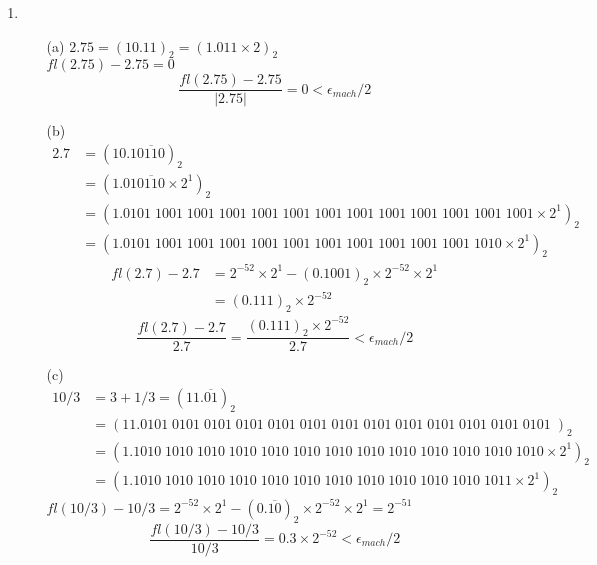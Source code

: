 \documentclass[UTF8]{ctexart}
\begin{document}
\begin{enumerate}
\item \begin{itemize}
\item[(a)] $2.75 = (10.11)_2 = (1.011 \times 2)_2$ \\
$fl(2.75) - 2.75 = 0$ \\
\[
	\frac{fl(2.75) - 2.75}{|2.75|} = 0  < \epsilon_{mach}/2
\]
\item[(b)] \begin{align*}
2.7 &= (10.1\overline{0110})_2 \\
&= (1.01\overline{0110} \times 2^1)_2 \\
&= (1.0101\;1001\;1001\;1001\;1001\;1001\;1001\;1001\;1001\;1001\;1001\;1001\;1001 \times 2^1)_2 \\
&= (1.0101\;1001\;1001\;1001\;1001\;1001\;1001\;1001\;1001\;1001\;1001\;1010 \times 2^1)_2
\end{align*}
\begin{align*}
fl(2.7) - 2.7 &= 2^{-52} \times 2^1 - (0.1001)_2 \times 2^{-52} \times 2^1 \\
&= (0.111)_2 \times 2^{-52}
\end{align*}
\[
	\frac{fl(2.7) - 2.7}{2.7} = \frac{(0.111)_2 \times 2^{-52}}{2.7} < \epsilon_{mach}/2
\]
\item[(c)] \begin{align*}
10/3 &= 3 + 1/3 = (11.\overline{01})_2 \\
&= (11.0101\;0101\;0101\;0101\;0101\;0101\;0101\;0101\;0101\;0101\;0101\;0101\;0101\;)_2 \\
&= (1.1010\;1010\;1010\;1010\;1010\;1010\;1010\;1010\;1010\;1010\;1010\;1010\;1010 \times 2^1)_2 \\
&= (1.1010\;1010\;1010\;1010\;1010\;1010\;1010\;1010\;1010\;1010\;1010\;1011 \times 2^1)_2 
\end{align*}
$fl(10/3) - 10/3 = 2^{-52} \times 2^1 - (0.\overline{10})_2 \times 2^{-52} \times 2^1 = 2^{-51}$ \\
\[
	\frac{fl(10/3) - 10/3}{10/3} = 0.3 \times 2^{-52} < \epsilon_{mach}/2 
\]
\end{itemize}

\end{enumerate}
\end{document}
